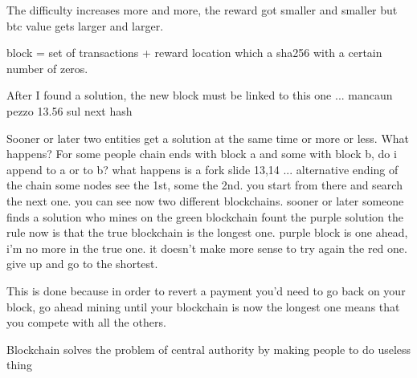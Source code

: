                     The difficulty increases more and more, the reward got smaller and smaller but btc value gets larger and larger.

                    block = set of transactions + reward location which a sha256 with a certain number of zeros.

                    After I found a solution, the new block must be linked to this one ... mancaun pezzo 13.56 sul next hash 


                    Sooner or later two entities get a solution at the same time or more or less. What happens?
                    For some people chain ends with block a and some with block b, do i append to a or to b?
                        what happens is a fork
                        slide 13,14 ...  
                            alternative ending of the chain
                            some nodes see the 1st, some the 2nd.
                            you start from there and search the next one.
                            you can see now two different blockchains.
                            sooner or later someone finds a solution
                                who mines on the green blockchain fount the purple solution
                                    the rule now is that the true blockchain is the longest one.
                                        purple block is one ahead, i'm no more in the true one. 
                                        it doesn't make more sense to try again the red one.
                                        give up and go to the shortest.
                                    
                            This is done because in order to revert a payment you'd need to go back on your block, go ahead mining until your blockchain is now the longest one
                            means that you compete with all the others.

                            Blockchain solves the problem of central authority by making people to do useless thing 





\fi